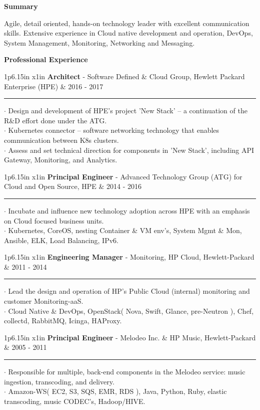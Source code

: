 \documentclass[10pt]{article}
\newcommand{\cvsection}[1]
{
	\begin{center}
		\large\textcolor{sectcol}{\textbf{#1}}
	\end{center}
}
\newcommand{\cveventtwo}[5]
{

\begin{tabular*}{1\textwidth}{p{6.15in}  x{1in}}
	\textbf{#2} - \textcolor{bgcol}{#3} &   \vspace{2.5pt}\textcolor{sectcol}{#1}
\end{tabular*}

\vspace{-8pt}
\textcolor{softcol}{\hrule}
\vspace{6pt}

  $\cdot$ #4\\[3pt]
  $\cdot$ #5\\[6pt]

}
\newcommand{\cveventthree}[6]
{

\begin{tabular*}{1\textwidth}{p{6.15in}  x{1in}}
	\textbf{#2} - \textcolor{bgcol}{#3} &   \vspace{2.5pt}\textcolor{sectcol}{#1}
\end{tabular*}

\vspace{-8pt}
\textcolor{softcol}{\hrule}
\vspace{6pt}

  $\cdot$ #4\\[3pt]
  $\cdot$ #5\\[3pt]
  $\cdot$ #6\\[6pt]

}
\begin{document}
\normalsize

\vspace{-6pt}
\cvsection{Summary}
Agile, detail oriented, hands-on technology leader with excellent
communication skills.  Extensive experience in Cloud native
development and operation, DevOps, System Management, Monitoring,
Networking and Messaging.

%
%

\cvsection{Professional Experience}

%
\cveventthree{2016 - 2017}{Architect}{Software Defined \& Cloud Group, Hewlett Packard Enterprise (HPE)}
{Design and development of HPE's project 'New Stack' -- a continuation of the R\&D effort done under the ATG.}
{Kubernetes connector -- software networking technology that enables communication between K8s clusters.}
{Assess and set technical direction for components in 'New Stack', including API Gateway, Monitoring, and Analytics.}

%
\cveventtwo{2014 - 2016}{Principal Engineer}{Advanced Technology Group
  (ATG) for Cloud and Open Source, HPE}
{Incubate and influence new technology adoption across HPE with an
  emphasis on Cloud focused business units.}
{Kubernetes, CoreOS, nesting Container \& VM env's, System Mgmt \&
  Mon, Ansible, ELK, Load Balancing, IPv6.}

%
\cveventtwo{2011 - 2014}{Engineering Manager}{Monitoring, HP Cloud, Hewlett-Packard}
{Lead the design and operation of HP's Public Cloud (internal) monitoring and
  customer Monitoring-aaS.}
{Cloud Native \& DevOps, OpenStack( Nova, Swift, Glance, pre-Neutron
  ), Chef, collectd, RabbitMQ, Icinga, HAProxy.}

%
\cveventtwo{2005 - 2011}{Principal Engineer}{Melodeo Inc. \& HP Music, Hewlett-Packard}
{Responsible for multiple, back-end components in the Melodeo service:
  music ingestion, transcoding, and delivery.}
{Amazon-WS( EC2, S3, SQS, EMR, RDS ), Java, Python, Ruby, elastic
  transcoding, music CODEC's, Hadoop/HIVE.}
\end{document}
